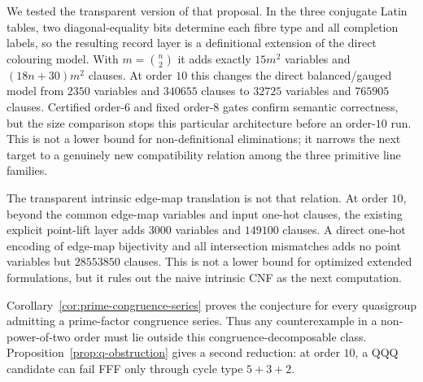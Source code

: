 We tested the transparent version of that proposal.  In the three conjugate
Latin tables, two diagonal-equality bits determine each fibre type and all
completion labels, so the resulting record layer is a definitional extension
of the direct colouring model.  With $m=\binom n2$ it adds exactly $15m^2$
variables and $(18n+30)m^2$ clauses.  At order $10$ this changes the direct
balanced/gauged model from $2350$ variables and $340655$ clauses to $32725$
variables and $765905$ clauses.  Certified order-$6$ and fixed order-$8$
gates confirm semantic correctness, but the size comparison stops this
particular architecture before an order-$10$ run.  This is not a lower bound
for non-definitional eliminations; it narrows the next target to a genuinely
new compatibility relation among the three primitive line families.

The transparent intrinsic edge-map translation is not that relation.  At
order $10$, beyond the common edge-map variables and input one-hot clauses,
the existing explicit point-lift layer adds $3000$ variables and $149100$
clauses.  A direct one-hot encoding of edge-map bijectivity and all
intersection mismatches adds no point variables but $28553850$ clauses.
This is not a lower bound for optimized extended formulations, but it rules
out the naive intrinsic CNF as the next computation.

Corollary~\ref{cor:prime-congruence-series} proves the conjecture for every
quasigroup admitting a prime-factor congruence series.  Thus any counterexample
in a non-power-of-two order must lie outside this congruence-decomposable
class.  Proposition~\ref{prop:q-obstruction} gives a second reduction: at
order $10$, a QQQ candidate can fail FFF only through cycle type $5+3+2$.

